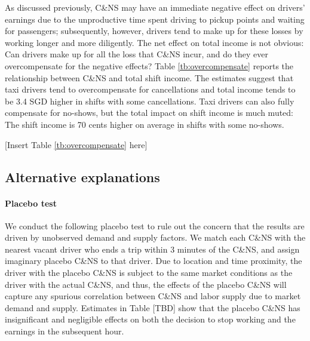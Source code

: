\documentclass[reviewmode]{restat}
\begin{document}
As discussed previously, C\&NS may have an immediate negative effect on drivers' earnings due to the 
unproductive time spent driving to pickup points and waiting for passengers; subsequently, however, 
drivers tend to make up for these losses by working longer and more diligently. The net effect on total
income is not obvious: Can drivers make up for all the loss that C\&NS incur, and do they ever 
overcompensate for the negative effects? Table \ref{tb:overcompensate} reports the relationship between 
C\&NS and total shift income.
The estimates suggest that taxi drivers tend to overcompensate for cancellations %
and total income tends to be 3.4 SGD higher in shifts with some cancellations.
Taxi drivers can also fully compensate for no-shows, but the total impact on shift income is much muted:
The shift income is 70 cents higher on average in shifts with some no-shows.

\begin{center}
	[Insert Table \ref{tb:overcompensate} here]
\end{center}



\subsection{Alternative explanations}

\paragraph{Placebo test}
We conduct the following placebo test to rule out the concern that the results are driven by unobserved demand and supply factors. We match each C\&NS with the nearest vacant driver who ends a trip within 3 minutes of the C\&NS, and assign imaginary placebo C\&NS to that driver. Due to location and time proximity, the driver with the placebo C\&NS is subject to the same market conditions as the driver with the actual C\&NS, and thus, the effects of the placebo C\&NS will capture any spurious correlation between C\&NS and labor supply due to market demand and supply. Estimates in Table [TBD] show that the placebo C\&NS has insignificant and negligible effects on both the decision to stop working and the earnings in the subsequent hour. 
\end{document}
